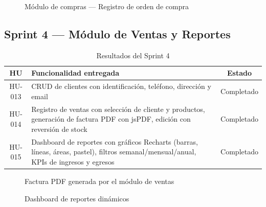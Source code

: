 \documentclass[12pt, letterpaper]{report}
\begin{document}
\begin{figure}[H]
\centering
{}
\caption{Módulo de compras --- Registro de orden de compra}
\label{fig:sprint3-compras}
\end{figure}

\subsection{Sprint 4 --- Módulo de Ventas y Reportes}

\begin{table}[H]
\centering
\caption{Resultados del Sprint 4}
\renewcommand{\arraystretch}{1.3}
\begin{tabularx}{\textwidth}{|c|X|c|}
\hline
\textbf{HU} & \textbf{Funcionalidad entregada} & \textbf{Estado} \\ \hline
HU-013 & CRUD de clientes con identificación, teléfono, dirección y email & Completado \\ \hline
HU-014 & Registro de ventas con selección de cliente y productos, generación de factura PDF con jsPDF, edición con reversión de stock & Completado \\ \hline
HU-015 & Dashboard de reportes con gráficos Recharts (barras, líneas, áreas, pastel), filtros semanal/mensual/anual, KPIs de ingresos y egresos & Completado \\ \hline
\end{tabularx}
\end{table}

\begin{figure}[H]
\centering
{}
\caption{Factura PDF generada por el módulo de ventas}
\label{fig:sprint4-factura}
\end{figure}

\begin{figure}[H]
\centering
{}
\caption{Dashboard de reportes dinámicos}
\label{fig:sprint4-reportes}
\end{figure}
\end{document}
